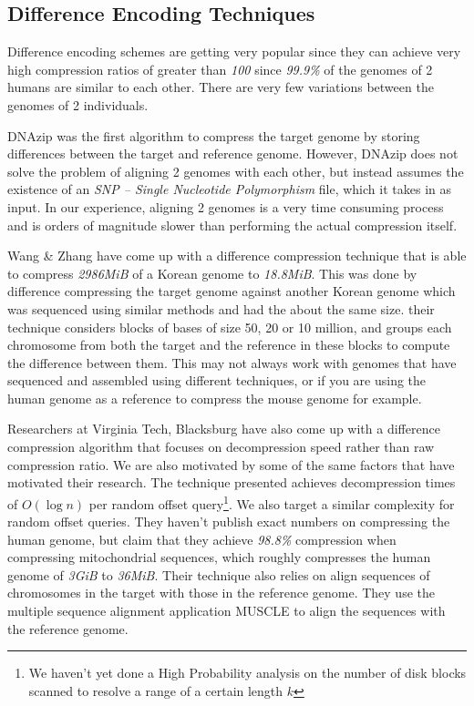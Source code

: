 \documentclass[11pt]{article}
\begin{document}
\subsection{Difference Encoding Techniques}

Difference encoding schemes are getting very popular since they can
achieve very high compression ratios of greater than \textit{100}
since \textit{99.9\%} of the genomes of 2 humans are similar to each
other. There are very few variations between the genomes of 2
individuals.

DNAzip\cite{dnazip}\cite{genomecompressionchenli} was the first
algorithm to compress the target genome by storing differences between
the target and reference genome. However, DNAzip does not solve the
problem of aligning 2 genomes with each other, but instead assumes the
existence of an \textit{SNP -- Single Nucleotide Polymorphism} file,
which it takes in as input. In our experience, aligning 2
genomes is a very time consuming process and is orders of magnitude
slower than performing the actual compression itself.

Wang \& Zhang\cite{wangzhang} have come up with a difference
compression technique that is able to compress \textit{2986MiB} of a
Korean genome to \textit{18.8MiB}. This was done by difference
compressing the target genome against another Korean genome which
was sequenced using similar methods and had the about the same
size. their technique considers blocks of bases of size 50, 20 or 10
million, and groups each chromosome from both the target and the
reference in these blocks to compute the difference between them. This
may not always work with genomes that have sequenced and assembled
using different techniques, or if you are using the human genome as a
reference to compress the mouse genome for example.

Researchers at Virginia Tech, Blacksburg\cite{vtechresearch} have also
come up with a difference compression algorithm that focuses on
decompression speed rather than raw compression ratio. We are also
motivated by some of the same factors that have motivated their
research. The technique presented achieves decompression times of
$O(\log{n})$ per random offset query\footnote{We haven't yet done a
  High Probability analysis on the number of disk blocks scanned to
  resolve a range of a certain length $k$}. We also target a similar
complexity for random offset queries. They haven't publish exact
numbers on compressing the human genome, but claim that they achieve
\textit{98.8\%} compression when compressing mitochondrial sequences,
which roughly compresses the human genome of \textit{3GiB} to
\textit{36MiB}. Their technique also relies on align sequences of
chromosomes in the target with those in the reference genome. They use
the multiple sequence alignment application MUSCLE\cite{muscle} to
align the sequences with the reference genome.
\end{document}
